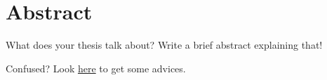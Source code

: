 \chapter*{Abstract}
\begin{spacing}{1.3}
What does your thesis talk about? Write a brief abstract explaining that!

Confused? Look \href{https://www.grammarly.com/blog/write-an-abstract/?gclid=CjwKCAiA7IGcBhA8EiwAFfUDsdFD0V9bMddE4No8oSqE8jzcsIDLfIzgginydLOlEVU9jmnIgS9UAxoCo_8QAvD_BwE&gclsrc=aw.ds}{here} to get some advices.
\end{spacing}
